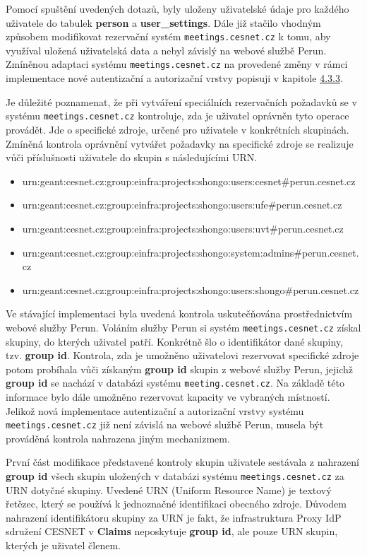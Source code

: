 \documentclass[
  printed, %
  twoside, %
  table,   %
  nolof,     %
  nolot,     %
]{fithesis3}
\begin{document}
Pomocí spuštění uvedených dotazů, byly uloženy uživatelské údaje pro každého uživatele do tabulek \textbf{person} a \textbf{user\_settings}. Dále již stačilo vhodným způsobem modifikovat rezervační systém \texttt{meetings.cesnet.cz} k tomu, aby využíval uložená uživatelská data a nebyl závislý na webové službě Perun. Zmíněnou adaptaci systému \texttt{meetings.cesnet.cz} na provedené změny v rámci implementace nové autentizační a autorizační vrstvy popisuji v kapitole \hyperref[ShongoImpl-web]{4.3.3}. 

\par
Je důležité poznamenat, že při vytváření speciálních rezervačních požadavků se v systému \texttt{meetings.cesnet.cz} kontroluje, zda je uživatel oprávněn tyto operace provádět. Jde o specifické zdroje, určené pro uživatele v konkrétních skupinách. Zmíněná kontrola oprávnění vytvářet požadavky na specifické zdroje se realizuje vůči příslušnosti uživatele do skupin s následujícími URN. 
\begin{itemize}
    \item urn:geant:cesnet.cz:group:einfra:projects:shongo:users:cesnet\#perun.cesnet.cz
    \item urn:geant:cesnet.cz:group:einfra:projects:shongo:users:ufe\#perun.cesnet.cz
    \item urn:geant:cesnet.cz:group:einfra:projects:shongo:users:uvt\#perun.cesnet.cz
    \item urn:geant:cesnet.cz:group:einfra:projects:shongo:system:admins\#perun.cesnet.cz
    \item urn:geant:cesnet.cz:group:einfra:projects:shongo:users:shongo\#perun.cesnet.cz
\end{itemize}

Ve stávající implementaci byla uvedená kontrola uskutečňována prostřednictvím webové služby Perun. Voláním služby Perun si systém \texttt{meetings.cesnet.cz} získal skupiny, do kterých uživatel patří. Konkrétně šlo o identifikátor dané skupiny, tzv. \textbf{group id}. Kontrola, zda je umožněno uživatelovi rezervovat specifické zdroje potom probíhala vůči získaným \textbf{group id} skupin z webové služby Perun, jejichž \textbf{group id} se nachází v databázi systému \texttt{meeting.cesnet.cz}. Na základě této informace bylo dále umožněno rezervovat kapacity ve vybraných místností. Jelikož nová implementace autentizační a autorizační vrstvy systému \texttt{meetings.cesnet.cz} již není závislá na webové službě Perun, musela být prováděná kontrola nahrazena jiným mechanizmem. 

\par
První část modifikace představené kontroly skupin uživatele sestávala z nahrazení \textbf{group id} všech skupin uložených v databázi systému \texttt{meetings.cesnet.cz} za URN \cite{rfc2141} dotyčné skupiny. Uvedené URN (Uniform Resource Name) je textový řetězec, který se používá k jednoznačné identifikaci obecného zdroje. Důvodem nahrazení identifikátoru skupiny za URN je fakt, že infrastruktura Proxy IdP sdružení CESNET v \textbf{Claims} neposkytuje \textbf{group id}, ale pouze URN skupin, kterých je uživatel členem. 
\end{document}
